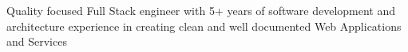 \documentclass[letter,10pt]{article}
\begin{document}
 Quality focused Full Stack engineer with 5+ years of software development and architecture experience in creating clean and well documented Web Applications and Services
\end{document}
